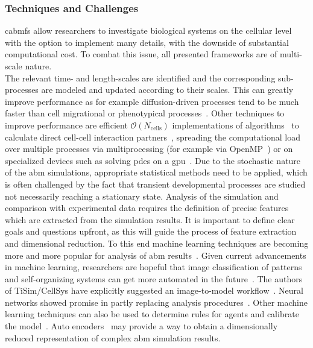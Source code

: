\subsubsection*{Techniques and Challenges}
\label{subsec:analysis-challenges}\noindent
\acp{cabmf} allow researchers to investigate biological systems on the cellular level
with the option to implement many details, with the downside of substantial computational
cost. To combat this issue, all presented frameworks are of multi-scale nature.\\
The relevant time- and length-scales are identified and the corresponding sub-processes
are modeled and updated according to their scales.
This can greatly improve performance as for example diffusion-driven processes tend to be
much faster than cell migrational or phenotypical processes~\cite{Keener2002}.
Other techniques to improve performance are efficient $\mathcal{O}(N_{\mathrm{cells}})$
implementations of algorithms~\cite{Meagher1982} to calculate direct cell-cell
interaction partners~\cite{}, spreading the computational load over multiple processes
via multiprocessing (for example via OpenMP~\cite{Chandra2001}) or on specialized devices
such as solving \acp{pde} on a \ac{gpu}~\cite{Steuwer2011}.
%
Due to the stochastic nature of the \ac{abm} simulations, appropriate statistical methods
need to be applied, which is often challenged by the fact that transient developmental
processes are studied not necessarily reaching a stationary state.
Analysis of the simulation and comparison with experimental data requires the definition
of precise features which are extracted from the simulation results.
It is important to define clear goals and questions upfront, as this will guide the
process of feature extraction and dimensional reduction.
To this end machine learning techniques are becoming more and more popular for analysis
of \ac{abm} results~\cite{Efimenko2020,Caicedo2017}.
Given current advancements in machine learning, researchers are hopeful that image
classification of patterns and self-organizing systems can get more automated in the
future~\cite{Ker2018,Efimenko2020}.
The authors of TiSim/CellSys have explicitly suggested an image-to-model workflow~\cite{Hoehme2016}.
Neural networks showed promise in partly replacing analysis procedures~\cite{Chen2021}.
Other machine learning techniques can also be used to determine rules for agents and
calibrate the model~\cite{Sivakumar2022}.
Auto encoders~\cite{Kramer1991} may provide a way to obtain a dimensionally reduced
representation of complex \ac{abm} simulation results.
